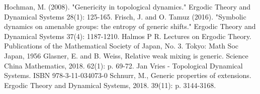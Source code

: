 \documentclass{article}
\begin{document}
\begin{CJK}{UTF8}{gbsn}
\begin{thebibliography}{99}
Hochman, M. (2008). "Genericity in topological dynamics." Ergodic Theory and Dynamical Systems 28(1): 125-165.
Frisch, J. and O. Tamuz (2016). "Symbolic dynamics on amenable groups: the entropy of generic shifts." Ergodic Theory and Dynamical Systems 37(4): 1187-1210.
Halmos P R. Lectures on Ergodic Theory. Publications of the Mathematical Society of Japan, No. 3. Tokyo: Math
Soc Japan, 1956
Glasner, E. and B. Weiss, Relative weak mixing is generic. Science China Mathematics, 2018. 62(1): p. 69-72.
Jan Vries - Topological Dynamical Systems. ISBN 978-3-11-034073-0
Schnurr, M., Generic properties of extensions. Ergodic Theory and Dynamical Systems, 2018. 39(11): p. 3144-3168.

\end{thebibliography}


\end{CJK}
\end{document}
